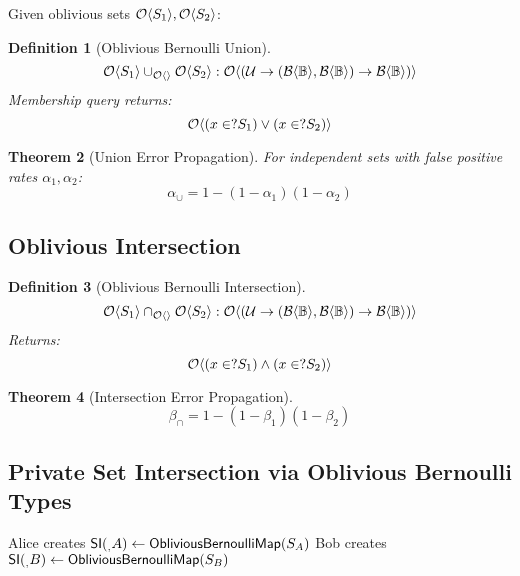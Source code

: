 \documentclass[11pt,final]{article}
\newcommand{\BernBool}{\mathcal{B}\langle \Bool \rangle}
\newcommand{\fprate}{\alpha}
\newcommand{\fnrate}{\beta}
\newtheorem{theorem}{Theorem}[section]
\newtheorem{definition}[theorem]{Definition}
\begin{document}
Given oblivious sets $\mathcal{O}\langle S_1 \rangle, \mathcal{O}\langle S_2 \rangle$:

\begin{definition}[Oblivious Bernoulli Union]
\begin{equation}
\Obv{S_1} \cup_{\Obv{}} \Obv{S_2} : \ObvMap{\Universe}{(\BernBool, \BernBool) \to \BernBool}
\end{equation}
Membership query returns:
\begin{equation}
\mathcal{O}\langle (x \in? S_1) \lor (x \in? S_2) \rangle
\end{equation}
\end{definition}

\begin{theorem}[Union Error Propagation]
For independent sets with false positive rates $\fprate_1, \fprate_2$:
\begin{equation}
\fprate_{\cup} = 1 - (1 - \fprate_1)(1 - \fprate_2)
\end{equation}
\end{theorem}

\subsection{Oblivious Intersection}

\begin{definition}[Oblivious Bernoulli Intersection]
\begin{equation}
\Obv{S_1} \cap_{\Obv{}} \Obv{S_2} : \ObvMap{\Universe}{(\BernBool, \BernBool) \to \BernBool}
\end{equation}
Returns:
\begin{equation}
\mathcal{O}\langle (x \in? S_1) \land (x \in? S_2) \rangle
\end{equation}
\end{definition}

\begin{theorem}[Intersection Error Propagation]
\begin{equation}
\fnrate_{\cap} = 1 - (1 - \fnrate_1)(1 - \fnrate_2)
\end{equation}
\end{theorem}

\subsection{Private Set Intersection via Oblivious Bernoulli Types}

\begin{algorithm}[H]
\caption{PSI via Oblivious Bernoulli Types}
Alice creates $\mathsf{SI}(_, A) \gets \mathsf{ObliviousBernoulliMap}(S_A)$\;
Bob creates $\mathsf{SI}(_, B) \gets \mathsf{ObliviousBernoulliMap}(S_B)$\;
\end{algorithm}
\end{document}
